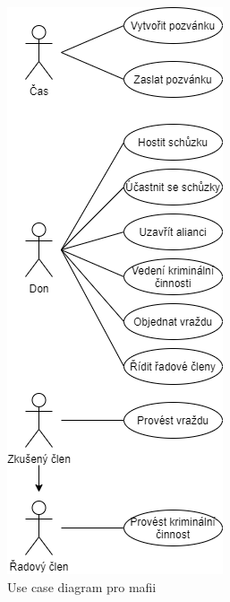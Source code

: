 \documentclass{article}
\begin{document}
\begin{figure}[!ht]
    
    \includegraphics[scale=0.75, keepaspectratio]{fig/USCD.png}
    \caption{Use case diagram pro mafii}
    \label{fig:UCD}
\end{figure}

\newpage
\end{document}
